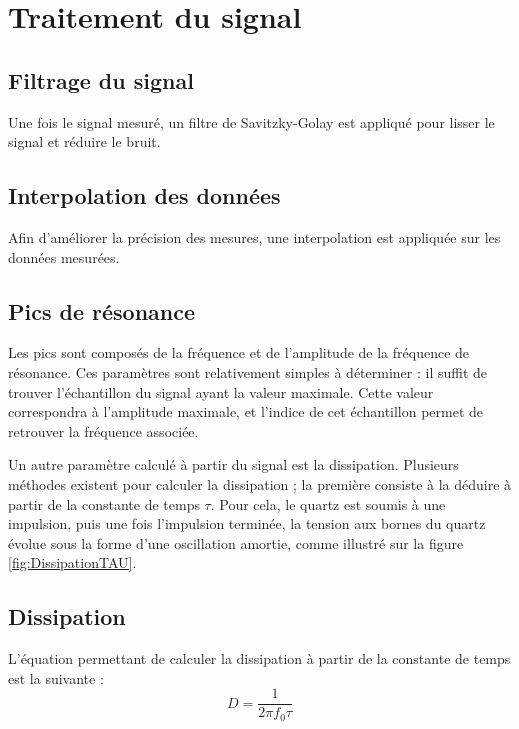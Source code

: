 \section{Traitement du signal}

\subsection{Filtrage du signal}

Une fois le signal mesuré, un filtre de Savitzky-Golay est appliqué pour lisser le signal et réduire le bruit.

\subsection{Interpolation des données}

Afin d'améliorer la précision des mesures, une interpolation est appliquée sur les données mesurées.

\subsection{Pics de résonance}

Les pics sont composés de la fréquence et de l'amplitude de la fréquence de résonance.  
Ces paramètres sont relativement simples à déterminer : il suffit de trouver l’échantillon du signal ayant la valeur maximale. Cette valeur correspondra à l'amplitude maximale, et l'indice de cet échantillon permet de retrouver la fréquence associée.

Un autre paramètre calculé à partir du signal est la dissipation.  
Plusieurs méthodes existent pour calculer la dissipation ; la première consiste à la déduire à partir de la constante de temps $\tau$.  
Pour cela, le quartz est soumis à une impulsion, puis une fois l'impulsion terminée, la tension aux bornes du quartz évolue sous la forme d'une oscillation amortie, comme illustré sur la figure \ref{fig:DissipationTAU}.

\subsection{Dissipation}

L'équation permettant de calculer la dissipation à partir de la constante de temps \cite{Edvardsson2024Dissipation} est la suivante :
\begin{equation}
    D = \frac{1}{2\pi f_0 \tau}
    \label{eq:Dissipation}
\end{equation}

